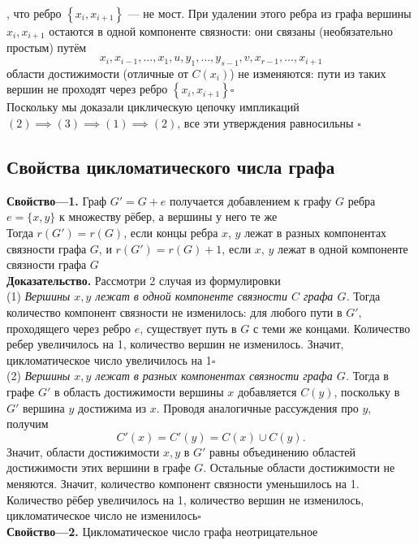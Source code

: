 \documentclass[a4paper]{article}
\begin{document}
, что ребро $\left\{x_i, x_{i+1}\right\}$ — не мост. При удалении этого ребра из графа вершины $x_i, x_{i+1}$ остаются в одной компоненте связности: они связаны (необязательно простым) путём
$$x_i, x_{i-1}, \ldots, x_1, u, y_1, \ldots, y_{s-1}, v, x_{r-1}, \ldots, x_{i+1}$$
 области достижимости (отличные от $C\left(x_i\right)$) не изменяются: пути из таких вершин не проходят через ребро $\left\{x_i, x_{i+1}\right\}$\hfill$\square$\\[2mm]
\indent Поскольку мы доказали циклическую цепочку импликаций $(2)\implies(3)\implies(1)\implies(2)$, все эти утверждения равносильны \hfill$\square$
\label{2.2}

\subsection{Свойства цикломатического числа графа}
\textbf{Свойство—1.} Граф $G'=G+e$ получается добавлением к графу $G$ ребра $e=\{x,y\}$ к множеству рёбер, а вершины у него те же\\
\indent Тогда $r(G')=r(G)$, если концы ребра $x$, $y$ лежат в разных компонентах связности графа $G$, и $r(G')=r(G)+1$, если $x$, $y$ лежат в одной компоненте связности графа $G$\\[2mm]
\indent\textbf{Доказательство.} Рассмотри 2 случая из формулировки\\[2mm]
\indent (1) \textit{Вершины $x,y$ лежат в одной компоненте связности $C$ графа $G$.} Тогда количество компонент связности не изменилось: для любого пути в $G'$, проходящего через ребро $e$, существует путь в $G$ с теми же концами. Количество ребер увеличилось на 1, количество вершин не изменилось. Значит, цикломатическое число увеличилось на 1\hfill$\square$\\[2mm]
\indent (2) \textit{Вершины $x,y$ лежат в разных компонентах связности графа $G$.} Тогда в графе $G'$ в область достижимости вершины $x$ добавляется $C(y)$, поскольку в $G'$ вершина $y$ достижима из $x$. Проводя аналогичные рассуждения про $y$, получим $$C'(x)=C'(y)=C(x)\cup C(y).$$
Значит, области достижимости $x,y$ в $G'$ равны объединению областей достижимости этих вершини в графе $G$. Остальные области достижимости не меняются. Значит, количество компонент связности уменьшилось на 1. Количество рёбер увеличилось на 1, количество вершин не изменилось, цикломатическое число не изменилось\hfill$\square$\\[3mm]
\indent\textbf{Свойство—2.} Цикломатическое число графа неотрицательное\\[2mm]
\end{document}
